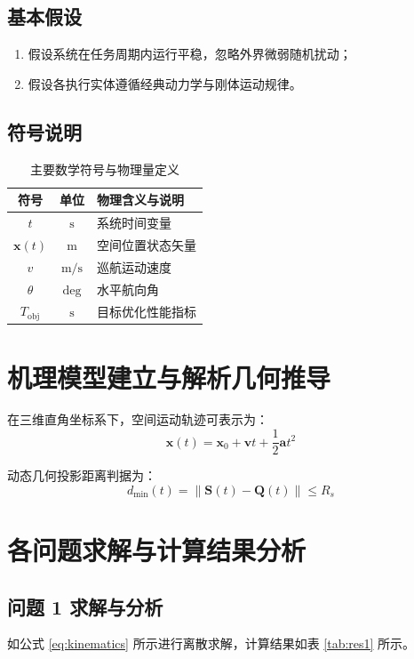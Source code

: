 \documentclass{cumcmthesis}
\begin{document}
\subsection{基本假设}
\begin{enumerate}
    \item 假设系统在任务周期内运行平稳，忽略外界微弱随机扰动；
    \item 假设各执行实体遵循经典动力学与刚体运动规律。
\end{enumerate}

\subsection{符号说明}
\begin{table}[H]
\centering
\caption{主要数学符号与物理量定义}
\begin{tabular}{ccl}
\toprule
\textbf{符号} & \textbf{单位} & \textbf{物理含义与说明} \\
\midrule
$t$ & $\text{s}$ & 系统时间变量 \\
$\bm{x}(t)$ & $\text{m}$ & 空间位置状态矢量 \\
$v$ & $\text{m/s}$ & 巡航运动速度 \\
$\theta$ & $\text{deg}$ & 水平航向角 \\
$T_{\text{obj}}$ & $\text{s}$ & 目标优化性能指标 \\
\bottomrule
\end{tabular}
\end{table}

\section{机理模型建立与解析几何推导}
在三维直角坐标系下，空间运动轨迹可表示为：
\begin{equation}
\bm{x}(t) = \bm{x}_0 + \bm{v} t + \frac{1}{2} \bm{a} t^2
\label{eq:kinematics}
\end{equation}

动态几何投影距离判据为：
\begin{equation}
d_{\text{min}}(t) = \left\| \bm{S}(t) - \bm{Q}(t) \right\| \le R_s
\end{equation}

\section{各问题求解与计算结果分析}
\subsection{问题 1 求解与分析}
如公式 \eqref{eq:kinematics} 所示进行离散求解，计算结果如表 \ref{tab:res1} 所示。
\end{document}
